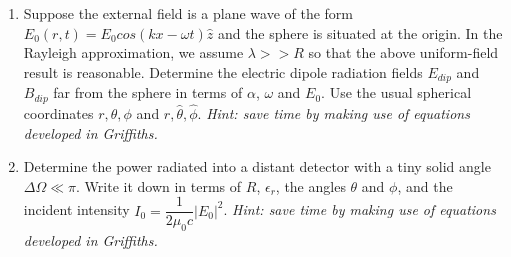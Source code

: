 \documentclass[fleqn]{article}
\begin{document}
\begin{enumerate}
\begin{enumerate}
      \item Suppose the external field is a plane wave of the form $E_0(r,t)=E_0 cos(kx-\omega t) \hat{z}$ and the
      sphere is situated at the origin. In the Rayleigh approximation, we assume $\lambda >> R$ so that the
      above uniform-field result is reasonable. Determine the electric dipole radiation fields $E_{dip}$ and
      $B_{dip}$ far from the sphere in terms of $\alpha$, $\omega$ and $E_0$. Use the usual spherical coordinates 
      $r, \theta, \phi$ and $\hat{r}, \hat{\theta}, \hat{\phi}$. 
      \emph{Hint: save time by making use of equations developed in Griffiths.}


      \item Determine the power radiated into a distant detector with a tiny solid angle $\Delta \Omega ≪ \pi$. 
      Write it down in terms of $R$, $\epsilon_r$, the angles $\theta$ and $\phi$, and the incident intensity 
      $I_0=\dfrac{1}{2 \mu_0 c}|E_0|^2$. \emph{Hint: save time by making use of equations developed in Griffiths.}
    \end{enumerate}
    
    \pagebreak

  \end{enumerate}
\end{document}
